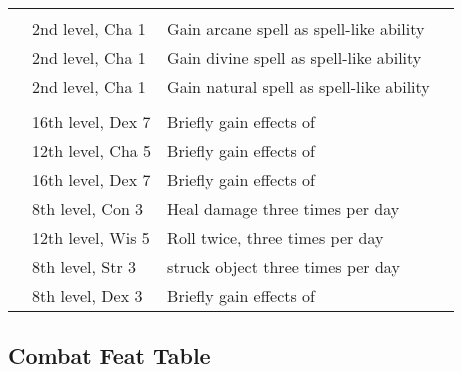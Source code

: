 {\begin{longtabu}{>{\lcol}p{10em} >{\lcol}p{15em} >{\lcol}X >{\lcol}p{3em}}
    \midrule
     &  &  &  \\
     & 2nd level, Cha 1 & Gain arcane spell as spell-like ability &  \\
     & 2nd level, Cha 1 & Gain divine spell as spell-like ability &  \\
     & 2nd level, Cha 1 & Gain natural spell as spell-like ability &  \\

    \midrule
     &  &  &  \\
     & 16th level, Dex 7 & Briefly gain effects of  &  \\
     & 12th level, Cha 5 & Briefly gain effects of  &  \\
     & 16th level, Dex 7 & Briefly gain effects of  &  \\
     & 8th level, Con 3 & Heal damage three times per day &  \\
     & 12th level, Wis 5 & Roll twice, three times per day &  \\
     & 8th level, Str 3 &  struck object three times per day &  \\
     & 8th level, Dex 3 & Briefly gain effects of  &  \\
\end{longtabu}}

\subsection{Combat Feat Table}\label{cap:Combat Feats}

